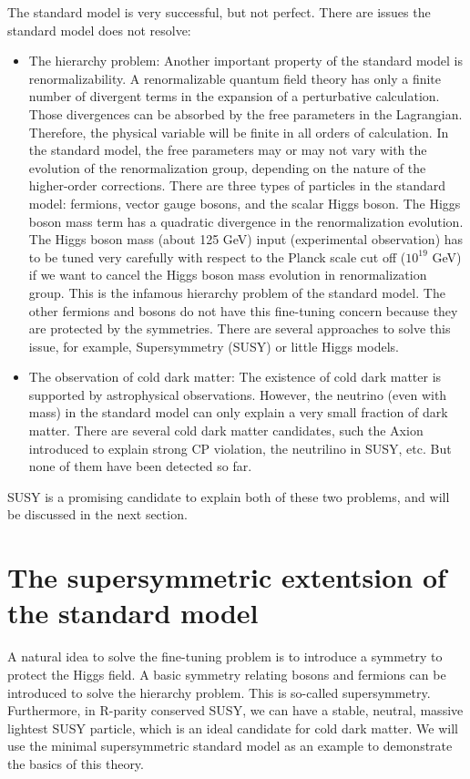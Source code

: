 The standard model is very successful, but not perfect. There are issues the standard model does not resolve:
\begin{itemize}
\item The hierarchy problem: Another important property of the standard model is renormalizability. A renormalizable quantum field theory has only a finite number of divergent terms in the expansion of a perturbative calculation. Those divergences can be absorbed by the free parameters in the Lagrangian. Therefore, the physical variable will be finite in all orders of calculation. In the standard model, the free parameters may or may not vary with the evolution of the renormalization group, depending on the nature of the higher-order corrections. There are three types of particles in the standard model: fermions, vector gauge bosons, and the scalar Higgs boson. The Higgs boson mass term has a quadratic divergence in the renormalization evolution. The Higgs boson mass (about 125 GeV) input (experimental observation) has to be tuned very carefully with respect to the Planck scale cut off ($10^{19}$ GeV) if we want to cancel the Higgs boson mass evolution in renormalization group. This is the infamous hierarchy problem of the standard model. The other fermions and bosons do not have this fine-tuning concern because they are protected by the symmetries. There are several approaches to solve this issue, for example, Supersymmetry (SUSY) or little Higgs models\cite{Schmaltz:2005ky}. 
\item The observation of cold dark matter: The existence of cold dark matter is supported by astrophysical observations. However, the neutrino (even with mass) in the standard model can only explain a very small fraction of dark matter. There are several cold dark matter candidates, such the Axion introduced to explain strong CP violation, the neutrilino in SUSY, etc. But none of them have been detected so far.
\end{itemize}

SUSY is a promising candidate to explain both of these two problems, and will be discussed in the next section. 

\clearpage
\section{The supersymmetric extentsion of the standard model}
A natural idea to solve the fine-tuning problem is to introduce a symmetry to protect the Higgs field. A basic symmetry relating bosons and fermions can be introduced to solve the hierarchy problem. This is so-called supersymmetry. Furthermore, in R-parity\cite{Martin:1997ns} conserved SUSY, we can have a stable, neutral, massive lightest SUSY particle, which is an ideal candidate for cold dark matter. We will use the minimal supersymmetric standard model as an example to demonstrate the basics of this theory. 

